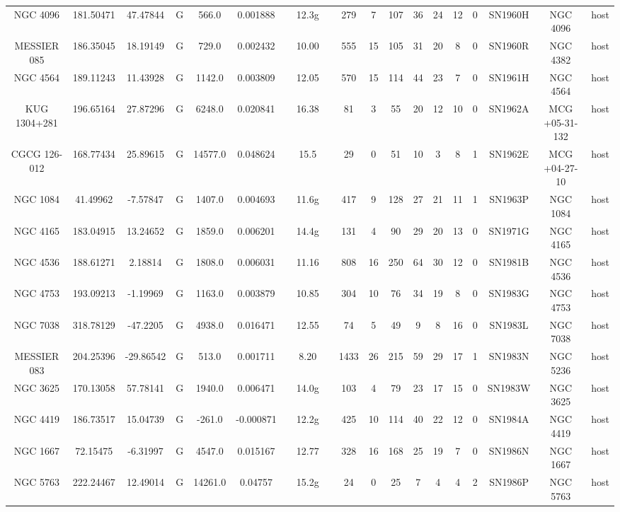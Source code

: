 \begin{table}
\begin{tabular}{ccccccccccccccccccc}
NGC 4096 & 181.50471 & 47.47844 & G & 566.0 & 0.001888 &  & 12.3g &  & 279 & 7 & 107 & 36 & 24 & 12 & 0 & SN1960H & NGC 4096 & host \\
MESSIER 085 & 186.35045 & 18.19149 & G & 729.0 & 0.002432 &  & 10.00 &  & 555 & 15 & 105 & 31 & 20 & 8 & 0 & SN1960R & NGC 4382 & host \\
NGC 4564 & 189.11243 & 11.43928 & G & 1142.0 & 0.003809 &  & 12.05 &  & 570 & 15 & 114 & 44 & 23 & 7 & 0 & SN1961H & NGC 4564 & host \\
KUG 1304+281 & 196.65164 & 27.87296 & G & 6248.0 & 0.020841 &  & 16.38 &  & 81 & 3 & 55 & 20 & 12 & 10 & 0 & SN1962A & MCG +05-31-132 & host \\
CGCG 126-012 & 168.77434 & 25.89615 & G & 14577.0 & 0.048624 &  & 15.5 &  & 29 & 0 & 51 & 10 & 3 & 8 & 1 & SN1962E & MCG +04-27-10 & host \\
NGC 1084 & 41.49962 & -7.57847 & G & 1407.0 & 0.004693 &  & 11.6g &  & 417 & 9 & 128 & 27 & 21 & 11 & 1 & SN1963P & NGC 1084 & host \\
NGC 4165 & 183.04915 & 13.24652 & G & 1859.0 & 0.006201 &  & 14.4g &  & 131 & 4 & 90 & 29 & 20 & 13 & 0 & SN1971G & NGC 4165 & host \\
NGC 4536 & 188.61271 & 2.18814 & G & 1808.0 & 0.006031 &  & 11.16 &  & 808 & 16 & 250 & 64 & 30 & 12 & 0 & SN1981B & NGC 4536 & host \\
NGC 4753 & 193.09213 & -1.19969 & G & 1163.0 & 0.003879 &  & 10.85 &  & 304 & 10 & 76 & 34 & 19 & 8 & 0 & SN1983G & NGC 4753 & host \\
NGC 7038 & 318.78129 & -47.2205 & G & 4938.0 & 0.016471 &  & 12.55 &  & 74 & 5 & 49 & 9 & 8 & 16 & 0 & SN1983L & NGC 7038 & host \\
MESSIER 083 & 204.25396 & -29.86542 & G & 513.0 & 0.001711 &  & 8.20 &  & 1433 & 26 & 215 & 59 & 29 & 17 & 1 & SN1983N & NGC 5236 & host \\
NGC 3625 & 170.13058 & 57.78141 & G & 1940.0 & 0.006471 &  & 14.0g &  & 103 & 4 & 79 & 23 & 17 & 15 & 0 & SN1983W & NGC 3625 & host \\
NGC 4419 & 186.73517 & 15.04739 & G & -261.0 & -0.000871 &  & 12.2g &  & 425 & 10 & 114 & 40 & 22 & 12 & 0 & SN1984A & NGC 4419 & host \\
NGC 1667 & 72.15475 & -6.31997 & G & 4547.0 & 0.015167 &  & 12.77 &  & 328 & 16 & 168 & 25 & 19 & 7 & 0 & SN1986N & NGC 1667 & host \\
NGC 5763 & 222.24467 & 12.49014 & G & 14261.0 & 0.04757 &  & 15.2g &  & 24 & 0 & 25 & 7 & 4 & 4 & 2 & SN1986P & NGC 5763 & host \\

\end{tabular}
\end{table}
